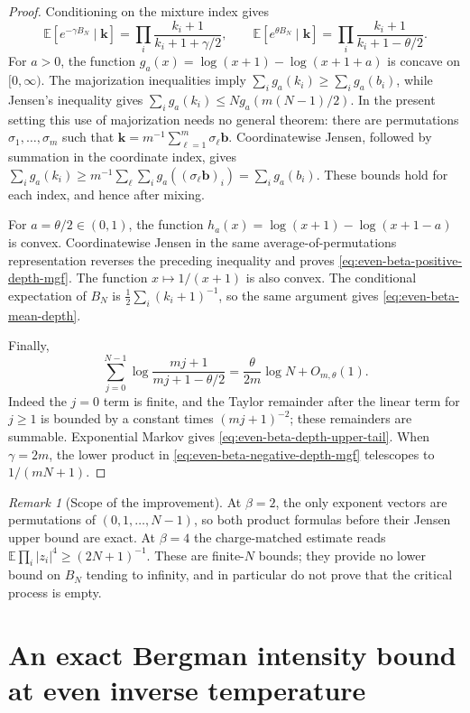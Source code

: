 \documentclass[11pt,a4paper]{article}
\numberwithin{equation}{section}
\theoremstyle{definition}
\theoremstyle{remark}
\newtheorem{remark}[theorem]{Remark}
\begin{document}
\begin{proof}
Conditioning on the mixture index gives
\[
 \mathbb E[e^{-\gamma B_N}\mid\mathbf k]
 =\prod_i\frac{k_i+1}{k_i+1+\gamma/2},\qquad
 \mathbb E[e^{\theta B_N}\mid\mathbf k]
 =\prod_i\frac{k_i+1}{k_i+1-\theta/2}.
\]
For $a>0$, the function
$g_a(x)=\log(x+1)-\log(x+1+a)$ is concave on $[0,\infty)$.
The majorization inequalities imply
$\sum_i g_a(k_i)\geq\sum_i g_a(b_i)$, while Jensen's inequality gives
$\sum_i g_a(k_i)\leq N g_a(m(N-1)/2)$.
In the present setting this use of majorization needs no general theorem:
there are permutations $\sigma_1,\ldots,\sigma_m$ such that
$\mathbf k=m^{-1}\sum_{\ell=1}^m\sigma_\ell\mathbf b$.
Coordinatewise Jensen, followed by summation in the coordinate index,
gives
$\sum_i g_a(k_i)\geq m^{-1}\sum_\ell\sum_i
g_a((\sigma_\ell\mathbf b)_i)=\sum_i g_a(b_i)$.
These bounds hold for each index, and hence after mixing.

For $a=\theta/2\in(0,1)$, the function
$h_a(x)=\log(x+1)-\log(x+1-a)$ is convex. Coordinatewise Jensen in the
same average-of-permutations representation reverses the preceding
inequality and proves \eqref{eq:even-beta-positive-depth-mgf}.
The function $x\mapsto1/(x+1)$ is also convex. The conditional expectation
of $B_N$ is $\frac12\sum_i(k_i+1)^{-1}$, so the same argument gives
\eqref{eq:even-beta-mean-depth}.

Finally,
\[
 \sum_{j=0}^{N-1}\log\frac{mj+1}{mj+1-\theta/2}
 =\frac{\theta}{2m}\log N+O_{m,\theta}(1).
\]
Indeed the $j=0$ term is finite, and the Taylor remainder after the
linear term for $j\geq1$ is bounded by a constant times $(mj+1)^{-2}$;
these remainders are summable. Exponential Markov gives
\eqref{eq:even-beta-depth-upper-tail}. When $\gamma=2m$, the lower product
in \eqref{eq:even-beta-negative-depth-mgf} telescopes to $1/(mN+1)$.
\end{proof}

\begin{remark}[Scope of the improvement]
At $\beta=2$, the only exponent vectors are permutations of
$(0,1,\ldots,N-1)$, so both product formulas before their Jensen upper
bound are exact. At $\beta=4$ the charge-matched estimate reads
$\mathbb E\prod_i|z_i|^4\geq(2N+1)^{-1}$.
These are finite-$N$ bounds; they provide no lower bound on
$B_N$ tending to infinity, and in particular do not prove that the
critical process is empty.
\end{remark}


\section{An exact Bergman intensity bound at even inverse temperature}
\label{sec:bergman-exclusion-even-beta}
\end{document}
